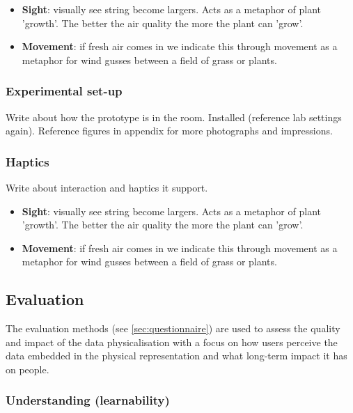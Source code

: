 \begin{itemize}
  \item \textbf{Sight}: visually see string become largers. Acts as a metaphor of plant 'growth'. The better the air quality the more the plant can 'grow'.
  \item \textbf{Movement}: if fresh air comes in we indicate this through movement as a metaphor for wind gusses between a field of grass or plants.
\end{itemize}

\subsubsection{Experimental set-up}

Write about how the prototype is in the room. Installed (reference lab settings again). Reference figures in appendix for more photographs and impressions.

\subsubsection{Haptics}

Write about interaction and haptics it support.

\begin{itemize}
  \item \textbf{Sight}: visually see string become largers. Acts as a metaphor of plant 'growth'. The better the air quality the more the plant can 'grow'.
  \item \textbf{Movement}: if fresh air comes in we indicate this through movement as a metaphor for wind gusses between a field of grass or plants.
\end{itemize}

\subsection{Evaluation}
\label{sec:evaluation_results}

The evaluation methods (see \ref{sec:questionnaire}) are used to assess the quality and impact of the data physicalisation with a focus on how users perceive the data embedded in the physical representation and what long-term impact it has on people.


\subsubsection{Understanding (learnability)}

